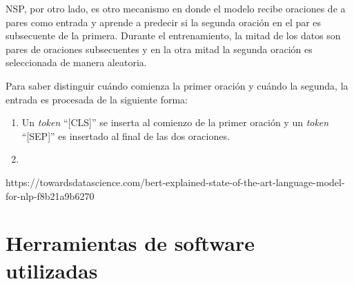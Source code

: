 
NSP, por otro lado, es otro mecanismo en donde el modelo recibe oraciones de a pares como entrada y aprende a predecir si la segunda oración en el par es subsecuente de la primera. Durante el entrenamiento, la mitad de los datos son pares de oraciones subsecuentes y en la otra mitad la segunda oración es seleccionada de manera aleatoria.

Para saber distinguir cuándo comienza la primer oración y cuándo la segunda, la entrada es procesada de la siguiente forma:

\begin{enumerate}
	\item Un \textit{token} ``[CLS]'' se inserta al comienzo de la primer oración y un \textit{token} ``[SEP]'' es insertado al final de las dos oraciones.
	\item 
\end{enumerate}


https://towardsdatascience.com/bert-explained-state-of-the-art-language-model-for-nlp-f8b21a9b6270


\section{Herramientas de software utilizadas}
